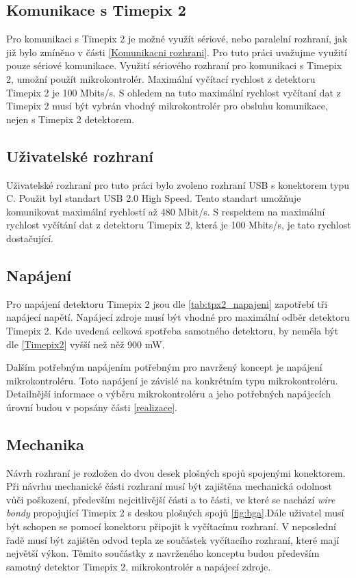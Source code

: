 \subsection{Komunikace s Timepix 2}
Pro komunikaci s Timepix 2 je možné využít sériové, nebo paralelní rozhraní, jak již bylo zmíněno v části \ref{Komunikacni rozhrani}. Pro tuto práci uvažujme využití pouze sériové komunikace. Využití sériového rozhraní pro komunikaci s Timepix 2, umožní použít mikrokontrolér. Maximální vyčítací rychlost z detektoru Timepix 2 je 100 Mbits/s. S ohledem na tuto maximální rychlost vyčítaní dat z Timepix 2 musí být vybrán vhodný mikrokontrolér pro obsluhu komunikace, nejen s Timepix 2 detektorem. 

\subsection{Uživatelské rozhraní}
Uživatelské rozhraní pro tuto práci bylo zvoleno rozhraní USB s konektorem typu C. Použit byl standart USB 2.0 High Speed. Tento standart umožňuje komunikovat maximální rychlostí až 480 Mbit/s. S respektem na maximální rychlost vyčítání dat z detektoru Timepix 2, která je 100 Mbits/s, je tato rychlost dostačující. 

\subsection{Napájení}
Pro napájení detektoru Timepix 2 jsou dle \ref{tab:tpx2_napajeni} zapotřebí tři napájecí napětí. Napájecí zdroje musí být vhodné pro maximální odběr detektoru Timepix 2. Kde uvedená celková spotřeba samotného detektoru, by neměla být dle \ref{Timepix2} vyšší než něž 900 mW. 
\par Dalším potřebným napájením potřebným pro navržený koncept je napájení mikrokontroléru. Toto napájení je závislé na konkrétním typu mikrokontroléru. Detailnější informace o výběru mikrokontroléru a jeho potřebných napájecích úrovní budou v popsány části \ref{realizace}. 

\subsection{Mechanika}
Návrh rozhraní je rozložen do dvou desek plošných spojů spojenými konektorem. Při návrhu mechanické části rozhraní musí být zajištěna mechanická odolnost vůči poškození, především nejcitlivější části a to části, ve které se nachází \textit{wire bondy} propojující Timepix 2 s deskou plošných spojů \ref{fig:bga}.Dále uživatel musí být schopen se pomocí konektoru připojit k vyčítacímu rozhraní. V neposlední řadě musí být zajištěn odvod tepla ze součástek vyčítacího rozhraní, které mají největší výkon. Těmito součástky z navrženého konceptu budou především samotný detektor Timepix 2, mikrokontrolér a napájecí zdroje. 
